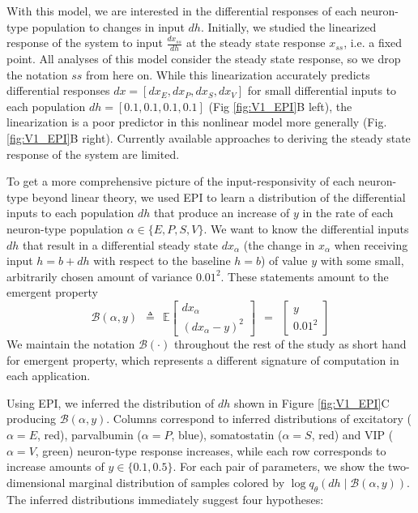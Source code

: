 \documentclass[11pt]{article}
\begin{document}
With this model, we are interested in the differential responses of each neuron-type population to changes in input $dh$. 
Initially, we studied the linearized response of the system to input $\frac{dx_{ss}}{dh}$ at the steady state response $x_{ss}$, i.e. a fixed point. 
All analyses of this model consider the steady state response, so we drop the notation $ss$ from here on.
While this linearization accurately predicts differential responses $dx = \left[ dx_{E} , dx_{P} , dx_{S} ,dx_{V} \right]$  for small differential inputs to each population $dh = \left[ 0.1 , 0.1 , 0.1 , 0.1 \right]$ (Fig \ref{fig:V1_EPI}B left), the linearization is a poor predictor in this nonlinear model more generally (Fig. \ref{fig:V1_EPI}B right).  Currently available approaches to deriving the steady state response of the system are limited.

To get a more comprehensive picture of the input-responsivity of each neuron-type beyond linear theory, we used EPI to learn a distribution of the differential inputs to each population $dh$ that produce an increase of $y$ in the rate of each neuron-type population $\alpha \in \{E, P, S, V \}$.  
We want to know the differential inputs $dh$ that result in a differential steady state $dx_{\alpha}$ (the change in $x_{\alpha}$ when receiving input $h=b + dh$ with respect to the baseline $h = b$) of value $y$ with some small, arbitrarily chosen amount of variance  $0.01^2$.   
These statements amount to the emergent property 
\begin{equation}
\mathcal{B}(\alpha, y) ~~\triangleq~~ 
\mathbb{E} \begin{bmatrix} dx_{\alpha} \\ (dx_{\alpha} - y)^2 \end{bmatrix} ~~=~~ \begin{bmatrix} y \\ 0.01^2 \end{bmatrix}
\end{equation}
We maintain the notation $\mathcal{B}(\cdot)$ throughout the rest of the study as short hand for emergent property, which represents a different signature of computation in each application. 

Using EPI, we inferred the distribution of $dh$ shown in Figure \ref{fig:V1_EPI}C producing $\mathcal{B}(\alpha, y)$.  
Columns correspond to inferred distributions of excitatory ($\alpha=E$, red), parvalbumin ($\alpha=P$, blue), somatostatin ($\alpha=S$, red) and VIP ($\alpha=V$, green) neuron-type response increases, while each row corresponds to increase amounts of $y \in \{0.1, 0.5\}$.  For each pair of parameters, we show the two-dimensional marginal distribution of samples colored by $\log q_\theta(dh \mid \mathcal{B}(\alpha, y))$.  The inferred distributions immediately suggest four hypotheses: \\
\end{document}
